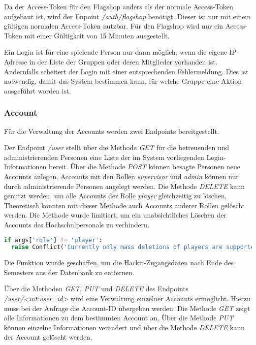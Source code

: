 Da der Access-Token für den Flagshop anders als der normale Access-Token aufgebaut ist, wird der Enpoint \textit{/auth/flagshop} benötigt. Dieser ist nur mit einem gültigen normalen Access-Token nutzbar. Für den Flagshop wird nur ein Access-Token mit einer Gültigkeit von 15 Minuten ausgestellt.

Ein Login ist für eine spielende Person nur dann möglich, wenn die eigene IP-Adresse in der Liste der Gruppen oder deren Mitglieder vorhanden ist. Andernfalls scheitert der Login mit einer entsprechenden Fehlermeldung. Dies ist notwendig, damit das System bestimmen kann, für welche Gruppe eine Aktion ausgeführt worden ist.

\subsubsection{Account}
Für die Verwaltung der Accounts werden zwei Endpoints bereitgestellt. 

Der Endpoint \textit{/user} stellt über die Methode \textit{GET} für die betreuenden und administrierenden Personen eine Liste der im System vorliegenden Login-Informationen bereit. Über die Methode \textit{POST} können besagte Personen neue Accounts anlegen. Accounts mit den Rollen \textit{supervisor} und \textit{admin} können nur durch administrierende Personen angelegt werden. Die Methode \textit{DELETE} kann genutzt werden, um alle Accounts der Rolle \textit{player} gleichzeitig zu löschen. Theoretisch könnten mit dieser Methode auch Accounts anderer Rollen gelöscht werden. Die Methode wurde limitiert, um ein unabsichtliches Löschen der Accounts des Hochschulpersonals zu verhindern.

\begin{lstlisting}[language=Python, frame=single, caption={GIS Löschen auf player-Accounts begrenzen}, captionpos=b, label={lst:gis-delete-all-players}]
if args['role'] != 'player':
  raise Conflict('Currently only mass deletions of players are supported.')
\end{lstlisting}

Die Funktion wurde geschaffen, um die Hackit-Zugangsdaten nach Ende des Semesters aus der Datenbank zu entfernen.

Über die Methoden \textit{GET}, \textit{PUT} und \textit{DELETE} des Endpoints \textit{/user/<int:user\_id>} wird eine Verwaltung einzelner Accounts ermöglicht. Hierzu muss bei der Anfrage die Account-ID übergeben werden. Die Methode \textit{GET} zeigt alle Informationen zu dem bestimmten Account an. Über die Methode \textit{PUT} können einzelne Informationen verändert und über die Methode \textit{DELETE} kann der Account gelöscht werden.

